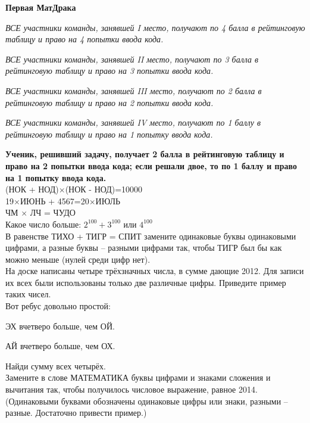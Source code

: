 \centerline{\bf \Huge Первая МатДрака}

\textit{ВСЕ участники команды, занявшей I место, получают по 4 балла в рейтинговую таблицу и право на 4 попытки ввода кода.}

\textit{ВСЕ участники команды, занявшей II место, получают по 3 балла в рейтинговую таблицу и право на 3 попытки ввода кода.}

\textit{ВСЕ участники команды, занявшей III место, получают по 2 балла в рейтинговую таблицу и право на 2 попытки ввода кода.}

\textit{ВСЕ участники команды, занявшей IV место, получают по 1 баллу в рейтинговую таблицу и право на 1 попытку ввода кода.}

\textbf{Ученик, решивший задачу, получает 2 балла в рейтинговую таблицу и право на 2 попытки ввода кода; если решали двое, то по 1 баллу и право на 1 попытку ввода кода.}\\

 (НОК + НОД)$\times$(НОК - НОД)=10000\\

 19$\times$ИЮНЬ + 4567=20$\times$ИЮЛЬ\\

 ЧМ $\times$ ЛЧ = ЧУДО\\

 Какое число больше:  $2^{100}+3^{100}$ или $4^{100}$\\

 В равенстве  ТИХО + ТИГР = СПИТ  замените одинаковые буквы одинаковыми цифрами, а разные буквы – разными цифрами так, чтобы ТИГР был бы как можно меньше (нулей среди цифр нет).\\

 На доске написаны четыре трёхзначных числа, в сумме дающие 2012. Для записи их всех были использованы только две различные цифры.
Приведите пример таких чисел.\\

 Вот ребус довольно простой:

ЭХ вчетверо больше, чем ОЙ.

АЙ вчетверо больше, чем ОХ.

Найди сумму всех четырёх.\\

 Замените в слове МАТЕМАТИКА буквы цифрами и знаками сложения и вычитания так, чтобы получилось числовое выражение, равное 2014.
(Одинаковыми буквами обозначены одинаковые цифры или знаки, разными – разные. Достаточно привести пример.)\\

